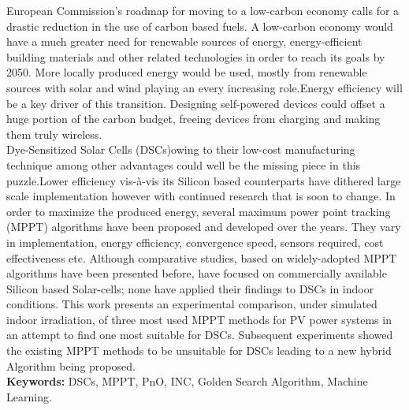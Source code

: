  European Commission's roadmap for moving to a low-carbon economy calls for a drastic reduction in the use of carbon based fuels. A low-carbon economy would have a much greater need for renewable sources of energy, energy-efficient building materials and other related technologies in order to reach its goals by 2050. More locally produced energy would be used, mostly from renewable sources with solar and wind playing an every increasing role.Energy efficiency will be a key driver of this transition. Designing self-powered devices could offset a huge portion of the carbon budget, freeing devices from charging and making them truly wireless. \\
 
  Dye-Sensitized Solar Cells (DSCs)owing to their low-cost manufacturing technique among other advantages could well be the missing piece in this puzzle.Lower efficiency vis-à-vis its Silicon based counterparts have dithered large scale implementation however with continued research that is soon to change. In order to  maximize the produced energy, several maximum power point tracking (MPPT) algorithms have been proposed and developed over the years. They vary in implementation, energy efficiency, convergence speed, sensors required, cost effectiveness etc. Although comparative studies, based on widely-adopted MPPT algorithms have been presented before, have focused on commercially available Silicon based Solar-cells; none have applied their findings to DSCs in indoor conditions. This work presents an experimental comparison, under simulated indoor irradiation, of three most used MPPT methods for PV power systems in an attempt to find one most suitable for DSCs. Subsequent experiments showed the existing MPPT methods to be unsuitable for DSCs leading to a new hybrid Algorithm being proposed.\\       

{\bf Keywords:} DSCs, MPPT, PnO, INC, Golden Search Algorithm, Machine Learning. 
\acresetall
